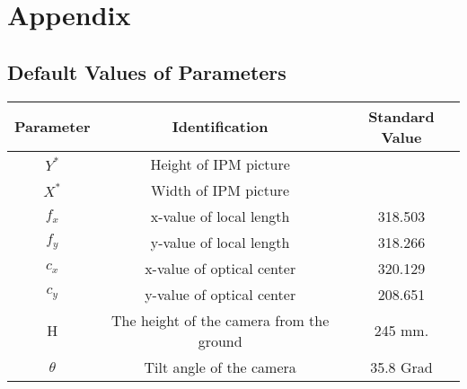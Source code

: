 %
\appendix 
\chapter{Appendix} 
\section{Default Values of Parameters} 


\begin{center}
  \begin{tabular}{ | c | c | c | }
    \hline
    Parameter & Identification				 			 &  Standard Value   \\ \hline
    $ Y^{*} $ & Height of IPM picture  			    	 &     \\ \hline
    $ X^{*} $ & Width of IPM picture  		  			 &    \\ \hline
    $ f_{x} $ & x-value of local length 			     &  318.503  \\ \hline
    $ f_{y} $ & y-value of local length 			     &  318.266  \\ \hline
    $ c_{x} $ & x-value of optical center			     &  320.129  \\ \hline
    $ c_{y} $ & y-value of optical center	  			 &  208.651  \\ \hline
    H		  & The height of the camera from the ground &  245 mm.  \\ \hline
    $ \theta $& Tilt angle of the camera      			 &  35.8 Grad  \\ \hline
  


  \end{tabular}
  \label{tab:parameters}
\end{center}

%